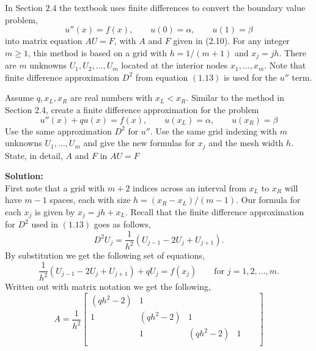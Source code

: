 \documentclass[12pt]{article}
\makeatletter
\theoremstyle{homework}
\newenvironment{exercise}[1]
{\def\@currentlabel{#1}\exercisecore}
{\endexercisecore}
\newcommand{\localhead}[1]{\par\smallskip\noindent\textbf{#1}\nobreak\\}%
\newcommand\solution{\localhead{Solution:}}
\makeatother
\begin{document}
\begin{exercise}{Problem P10} In Section $2.4$ the textbook uses finite differences to convert the boundary
  value problem, 
  \begin{equation*}
    u''(x) = f(x), \qquad u(0) = \alpha, \qquad u(1) = \beta
  \end{equation*}
  into matrix equation $AU = F$, with $A$ and $F$ given in (2.10). For any integer $m \geq 1$, 
  this method is based on a grid with $h = 1/(m + 1)$ and $x_j = jh$. There are $m$ unknowns
  $U_1, U_2, \dots, U_m$ located at the interior nodes $x_1,\dots, x_m$. Note that finite difference 
  approximation $D^2$ from equation $(1.13)$ is used for the $u''$ term. 
  
  Assume $q, x_L, x_R$ are real numbers with $x_L < x_R$. Similar to the method in Section 2.4, 
  create a finite difference approximation for the problem
  \begin{equation*}
    u''(x) + qu(x) = f(x),\qquad u(x_L) = \alpha,\qquad u(x_R) = \beta
  \end{equation*} 
  Use the same approximation $D^2$ for $u''$. Use the same grid indexing with $m$ unknowns $U_1, \dots,U_m$
  and give the new formulas for $x_j$ and the mesh width $h$. State, in detail, $A$ and $F$ in $AU = F$
  \solution 
  First note that a grid with $m + 2$ indices across an interval from $x_L$ to $x_R$ will have
  $m-1$ spaces, each with size $h = (x_R - x_L)/(m - 1)$.
  Our formula for each $x_j$ is given by $x_j = jh + x_L$. 
    Recall that the finite difference approximation for $D^2$ used in $(1.13)$ goes as follows, 
  \begin{equation*}
    D^2U_j = \frac{1}{h^2}\left(U_{j - 1} -2U_j + U_{j + 1}\right).
  \end{equation*}
  By substitution we get the following set of equations, 
  \begin{equation*}
    \frac{1}{h^2}\left(U_{j - 1} -2U_j + U_{j + 1}\right) + qU_j = f(x_j) \qquad \text{for } j = 1, 2,\dots, m.
  \end{equation*}
  Written out with matrix notation we get the following, 
  \begin{equation*}
    A = \frac{1}{h^2}
    \begin{bmatrix}
         (qh^2 - 2) &    1    &         &         &         &         \\ 
               1 & (qh^2 - 2) &    1    &         &         &         \\ 
                 &    1    & (qh^2 - 2) &    1    &         &         \\ 

\end{bmatrix}
\end{equation*}
\end{exercise}
\end{document}
